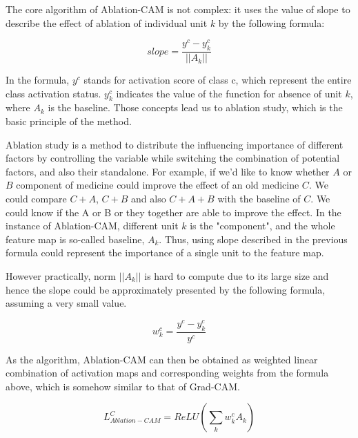 \documentclass[conference]{IEEEtran}
\begin{document}
The core algorithm of Ablation-CAM is not complex: it uses the value of slope to describe the effect of ablation of individual unit $k$ by the following formula:

$$slope = \frac{y^c-y^c_k}{||A_k||}$$

In the formula, $y^c$ stands for activation score of class c, which represent the entire class activation status. $y^c_k$ indicates the value of the function for absence of unit $k$, where $A_k$ is the baseline. Those concepts lead us to ablation study, which is the basic principle of the method.\par
Ablation study is a method to distribute the influencing importance of different factors by controlling the variable while switching the combination of potential factors, and also their standalone. For example, if we'd like to know whether $A$ or $B$ component of medicine could improve the effect of an old medicine $C$. We could compare $C+A$, $C+B$ and also $C+A+B$ with the baseline of $C$. We could know if the A or B or they together are able to improve the effect. In the instance of Ablation-CAM, different unit $k$ is the "component", and the whole feature map is so-called baseline, $A_k$. Thus, using slope described in the previous formula could represent the importance of a single unit to the feature map.\par
However practically, norm $||A_k||$ is hard to compute due to its large size and hence the slope could be approximately presented by the following formula, assuming a very small value.

$$w^c_k = \frac{y^c-y^c_k}{y^c}$$

As the algorithm, Ablation-CAM can then be obtained as weighted linear combination of activation maps and corresponding weights from the formula above, which is somehow similar to that of Grad-CAM.

$$L^C_{Ablation-CAM}=ReLU(\sum_k {w^c_k}{A_k})$$
\end{document}
